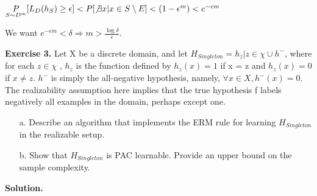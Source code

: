 \documentclass{article}
\newcommand{\<}{\langle}
\renewcommand{\>}{\rangle}
\theoremstyle{definition}
\begin{document}
$\underset{S \sim D^{m}}{P}[L_D(h_S) \geq \epsilon] < P[\not\exists x|x \in S \setminus E] < (1 - \epsilon^m) < e^{-\epsilon m}$

We want $e^{-\epsilon m} < \delta \Rightarrow m > \frac{\log \delta}{\epsilon}$. 

\begin{figure}[hbt!]
\centering
{}
\label{fig:my_label}
\end{figure}

\textbf{Exercise 3.} Let X be a discrete domain, and let $H_{Singleton} = {h_z | z \in \chi } \cup {h^- }$, where for each $z \in \chi$ , $h_z$ is the function defined by $h_z (x) = 1$ if x = z and $h_z (x) = 0$ if $x \neq z$. $h ^-$ is simply the all-negative hypothesis, namely, $\forall x \in X, h^- (x) = 0$.
The realizability assumption here implies that the true hypothesis f labels negatively all examples in the domain, perhaps except one.

\begin{itemize}
    \item[a.] Describe an algorithm that implements the ERM rule for learning $H_{Singleton}$ in the realizable setup.
    \item[b.] Show that $H_{Singleton}$ is PAC learnable. Provide an upper bound on the sample complexity.
\end{itemize}

\textbf{Solution.} 
\end{document}

